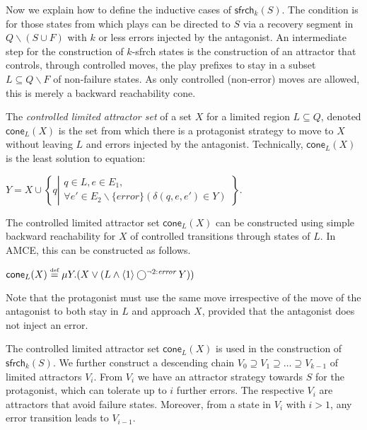 \documentclass[times,10pt,twocolumn]{article}
\newcommand\cla{\mathsf{cone}}
\newcommand\safe{\mathsf{sfrch}}
\newcommand{\emerr}{\textit{error}}
\newcommand{\emserr}{\textit{\scriptsize error}}
\newcommand{\defn}{\stackrel{\mbox{\tiny def}}{=}}
\newcommand{\nxt}{\bigcirc}
\begin{document}
Now we explain how to define the inductive cases of $\safe_k(S)$. 
The condition is for those states from which plays can be directed to 
$S$ via a recovery segment in $Q\smallsetminus (S\cup F)$ 
with $k$ or less errors injected by the antagonist. 
An intermediate step for the construction of $k$-sfrch states is the construction 
of an attractor\label{reply2.attractor} that controls, through controlled moves, 
the play prefixes to stay in a 
subset $L\subseteq Q\smallsetminus F$ of non-failure states. 
As only controlled (non-error) moves are allowed, 
this is merely a backward reachability cone.

The \emph{controlled limited attractor set} of a set $X$ for a
limited region $L\subseteq Q$, denoted $\cla_L(X)$ is the set 
from which there is a protagonist strategy to move to $X$ without leaving $L$ 
and errors injected by the antagonist.  
Technically, $\cla_L(X)$ is the least solution to 
equation:\label{reply2.cla} 
\begin{center} 
$Y = X\cup\left\{q\left| \begin{array}{l} 
q\in L,e\in E_1,\\
\forall e'\in E_2\smallsetminus \{\emerr\}( \delta(q,e,e')\in Y)
\end{array}\right.\right\}$.   
\end{center} 
The controlled limited attractor set 
$\cla_L(X)$ can be constructed using simple backward reachability 
for $X$ of controlled transitions through states of $L$.  
In AMCE, this can be constructed as follows. 
\begin{center} 
\label{reply2.cla.alg}
$\cla_L(X)\defn \mu Y. (X\vee(L\wedge \langle 1\rangle \nxt^{\neg 2:\emserr} Y))$
\end{center} 
Note that the protagonist must use the same move irrespective 
of the move of the antagonist to both stay in $L$ and approach $X$, 
provided that the antagonist does not inject an error.




The controlled limited attractor set\label{reply2.limit.attractor} 
$\cla_L(X)$ is used in the construction of $\safe_k(S)$.  
We further construct a descending chain 
$V_0 \supseteq V_1 \supseteq \ldots\supseteq V_{k-1}$ of limited attractors $V_i$. 
From $V_i$ we have an attractor strategy towards $S$ for the protagonist, 
which can tolerate 
up to $i$ further errors.
The respective $V_i$ are attractors that avoid failure states.  \label{reply2.error2failure} 
Moreover, from a state in $V_i$ with $i>1$, 
any error transition leads to $V_{i-1}$.  
\end{document}
